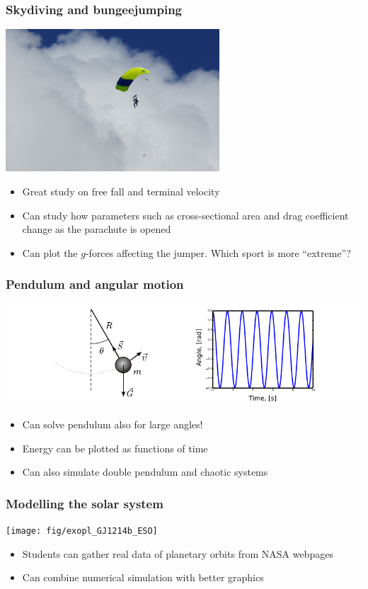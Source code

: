 \documentclass[english, 12pt]{beamer}
\begin{document}
\begin{frame}[fragile]
\frametitle{Skydiving and bungeejumping}

\begin{center}
\includegraphics[width=0.6\textwidth]{fig/skydiving}
\end{center}

\begin{itemize}
	\item Great study on free fall and terminal velocity
	\item Can study how parameters such as cross-sectional area and drag coefficient change as the parachute is opened
	\item Can plot the $g$-forces affecting the jumper. Which sport is more ``extreme''?
\end{itemize}
\end{frame}

\begin{frame}[fragile]
\frametitle{Pendulum and angular motion}

\begin{center}
\includegraphics[width=\textwidth]{fig/pendulum}
\end{center}

\begin{itemize}
	\item Can solve pendulum also for large angles!
	\item Energy can be plotted as functions of time
	\item Can also simulate double pendulum and chaotic systems
\end{itemize}
\end{frame}

\begin{frame}[fragile]
\frametitle{Modelling the solar system}

\begin{center}
\texttt{[image: fig/exopl\_GJ1214b\_ESO]}
\end{center}

\begin{itemize}
	\item Students can gather real data of planetary orbits from NASA webpages
	\item Can combine numerical simulation with better graphics
\end{itemize}
\end{frame}
\end{document}
